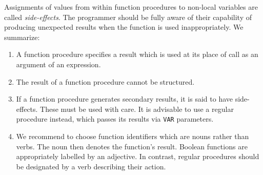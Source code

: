 Assignments of values from within function procedures to non-local variables are called
\emph{side-effects}. The programmer should be fully aware of their capability of producing
unexpected results when the function is used inappropriately. We summarize:
\begin{enumerate}
  \item A function procedure specifies a result which is used at its place of call as an
    argument of an expression.
  \item The result of a function procedure cannot be structured.
  \item If a function procedure generates secondary results, it is said to have side-effects.
    These must be used with care. It is advisable to use a regular procedure instead,
    which passes its results via \verb|VAR| parameters.
  \item We recommend to choose function identifiers which are nouns rather than verbs. The
    noun then denotes the function's result. Boolean functions are appropriately labelled
    by an adjective.  In contrast, regular procedures should be designated by a verb
    describing their action.
\end{enumerate}
